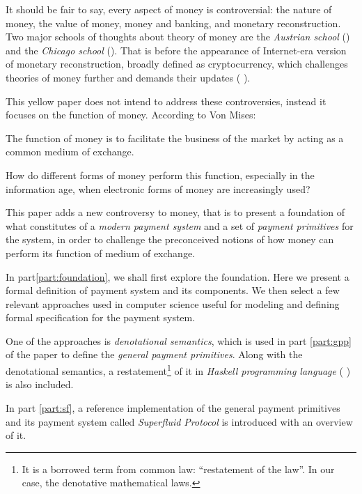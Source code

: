 It should be fair to say, every aspect of money is controversial: the nature of money, the value of
money, money and banking, and monetary reconstruction. Two major schools of thoughts about theory of
money are the \textit{Austrian school} (\cite{von2013theory}) and the \textit{Chicago school}
(\cite{friedman1989quantity}). That is before the appearance of Internet-era version of monetary
reconstruction, broadly defined as cryptocurrency, which challenges theories of money further and
demands their updates (\cite{ammous2018can} \cite{hardle2020understanding}).

This yellow paper does not intend to address these controversies, instead it focuses on the function
of money. According to Von Mises:

\begin{displayquote}
The function of money is to facilitate the business of the market by acting as a common medium of
exchange. 
\end{displayquote}

How do different forms of money perform this function, especially in the information age, when
electronic forms of money are increasingly used?

This paper adds a new controversy to money, that is to present a foundation of what constitutes of
a \textit{modern payment system} and a set of \textit{payment primitives} for the system, in order
to challenge the preconceived notions of how money can perform its function of medium of exchange.

In part\ref{part:foundation}, we shall first explore the foundation. Here we present a formal
definition of payment system and its components. We then select a few relevant approaches used in
computer science useful for modeling and defining formal specification for the payment system.

One of the approaches is \textit{denotational semantics}, which is used in part \ref{part:gpp} of
the paper to define the \textit{general payment primitives}. Along with the denotational semantics,
a restatement\footnote{It is a borrowed term from common law: ``restatement of the law''. In our
case, the denotative mathematical laws.} of it in \textit{Haskell programming language}
(\cite{hudak1992report} \cite{jones2003haskell} \cite{marlow2010haskell}) is also included.

In part \ref{part:sf}, a reference implementation of the general payment primitives and its payment
system called \textit{Superfluid Protocol} is introduced with an overview of it.

